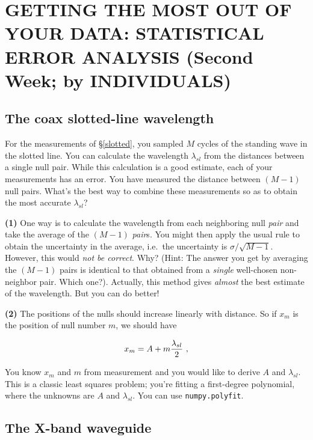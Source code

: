 \documentclass[11pt,preprint]{aastex}
\begin{document}
\section {GETTING THE MOST OUT OF YOUR DATA: STATISTICAL ERROR
ANALYSIS (Second Week; by INDIVIDUALS)} \label{secondweek}

\subsection{The coax slotted-line wavelength} \label{lbandcoax} 
\label{slottedls}

	For the measurements of \S \ref{slotted}, you sampled $M$
        cycles of the standing wave in the slotted line. You can
        calculate the wavelength $\lambda_{sl}$ from the distances
        between a single null pair. While this calculation is a good
        estimate, each of your measurements has an error. You have
        measured the distance between $(M-1)$ null pairs. What's the
        best way to combine these measurements so as to obtain the most
        accurate $\lambda_{sl}$?

{\bf (1)} One way is to calculate the wavelength from each neighboring
null {\it pair} and take the average of the $(M-1)$ {\it pair}s.  You
might then apply the usual rule to obtain the uncertainty in the
average, i.e.\ the uncertainty is $\sigma/\sqrt{M-1}$.
However, this would {\it not be correct}.  Why? (Hint: The answer you
get by averaging the $(M-1)$ pairs is identical to that obtained from a
{\it single} well-chosen non-neighbor pair.  Which one?).  Actually,
this method gives {\it almost} the best estimate of the wavelength.  But
you can do better!

	{\bf (2)} The positions of the nulls should increase linearly
with distance. So if $x_{m}$ is the position of null number $m$, we
should have

\begin{equation}
x_m = A + m {\lambda_{sl} \over 2} \ ,
\end{equation}

\noindent You know $x_m$ and $m$ from measurement and you would like to
derive $A$ and $\lambda_{sl}$. This is a classic least squares problem;
you're fitting a first-degree polynomial, where the unknowns are $A$ and
$\lambda_{sl}$. You can use {\tt numpy.polyfit}.

\subsection{The X-band waveguide}
\end{document}
